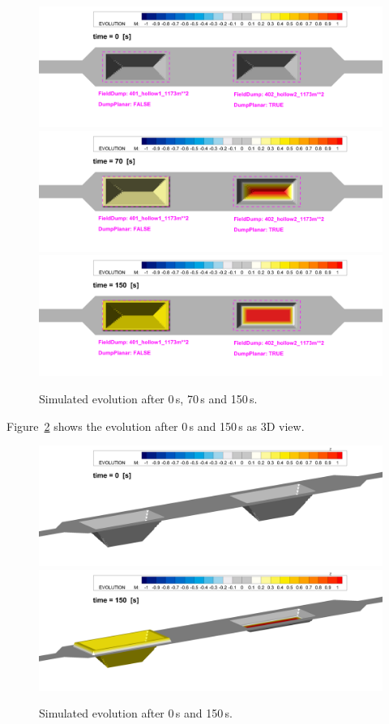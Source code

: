 \begin{figure} [H]
\centering
\includegraphics[scale=0.14]{img/result000_zoom.png}
\includegraphics[scale=0.14]{img/result070_zoom.png}
\includegraphics[scale=0.14]{img/result150_zoom.png}
\caption{Simulated evolution after 0\,s, 70\,s and 150\,s.}\label{E2result50}
\end{figure}


\newpage

Figure~\ref{E2result3D} shows the evolution after 0\,s and 150\,s as 3D view.
\begin{figure} [H]
\centering
\includegraphics[scale=0.14]{img/result000_zoom3D.png}
\includegraphics[scale=0.14]{img/result150_zoom3D.png}
\caption{Simulated evolution after 0\,s and 150\,s.}\label{E2result3D}
\end{figure}
